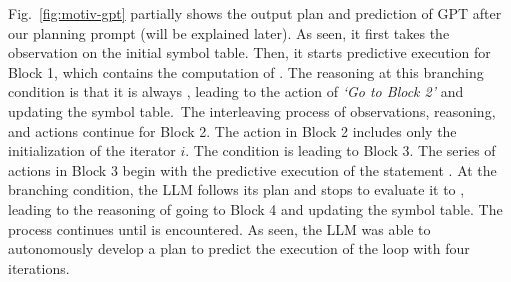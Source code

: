 



Fig.~\ref{fig:motiv-gpt} partially shows the output plan and
prediction of GPT after our planning prompt (will be explained
later).
As seen, it first takes the observation on the initial symbol
table. Then, it starts predictive execution for Block 1, which
contains the computation of .  The reasoning at this
branching condition is that it is always , leading to the
action of {\em `Go to Block 2'} and updating the symbol table.~The
interleaving process of observations, reasoning, and actions
continue for Block 2. The action in Block 2 includes only the
initialization of the iterator $i$.  The condition is 
leading to Block 3.  The series of actions in Block 3 begin with the
predictive execution of the statement . At the
branching condition, the LLM follows its plan and stops to evaluate it
to , leading to the reasoning of going to Block 4 and
updating the symbol table.  The process continues until
 is encountered.  As seen, the LLM was able to
autonomously develop a plan to predict the execution of the loop with
four iterations.

